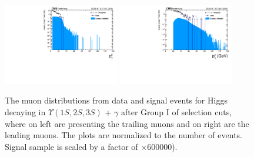 


\begin{figure}[!htbp]
\begin{center}
\includegraphics[width=0.45\textwidth]{figures/outputPlots/HtoUpsilon_Cat0_ZZZZZ/nEvts/data_x_mc/withKinCuts/h_withKin_TrailingMu_pt}\hspace*{1.cm}
\includegraphics[width=0.45\textwidth]{figures/outputPlots/HtoUpsilon_Cat0_ZZZZZ/nEvts/data_x_mc/withKinCuts/h_withKin_LeadingMu_pt}
\end{center}\vspace*{-.5cm}
\caption{The \PT muon distributions from data and signal events for Higgs decaying in $\Upsilon(1S,2S,3S)$ + $\gamma$ after Group I of selection cuts, where on left are presenting the trailing muons and on right are the leading muons. The plots are normalized to the number of events. Signal sample is scaled by a factor of $\times 600000$).}
\label{fig:pTMuons_HtoUpsilon_Cat0_groupI_plus_II}
\end{figure}



